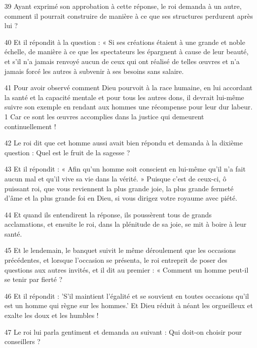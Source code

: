 \par 39 Ayant exprimé son approbation à cette réponse, le roi demanda à un autre, comment il pourrait construire de manière à ce que ses structures perdurent après lui ?

\par 40 Et il répondit à la question : « Si ses créations étaient à une grande et noble échelle, de manière à ce que les spectateurs les épargnent à cause de leur beauté, et s'il n'a jamais renvoyé aucun de ceux qui ont réalisé de telles œuvres et n'a jamais forcé les autres à subvenir à ses besoins sans salaire.

\par 41 Pour avoir observé comment Dieu pourvoit à la race humaine, en lui accordant la santé et la capacité mentale et pour tous les autres dons, il devrait lui-même suivre son exemple en rendant aux hommes une récompense pour leur dur labeur. 1 Car ce sont les œuvres accomplies dans la justice qui demeurent continuellement !

\par 42 Le roi dit que cet homme aussi avait bien répondu et demanda à la dixième question : Quel est le fruit de la sagesse ?

\par 43 Et il répondit : « Afin qu'un homme soit conscient en lui-même qu'il n'a fait aucun mal et qu'il vive sa vie dans la vérité. » Puisque c'est de ceux-ci, ô puissant roi, que vous reviennent la plus grande joie, la plus grande fermeté d'âme et la plus grande foi en Dieu, si vous dirigez votre royaume avec piété.

\par 44 Et quand ils entendirent la réponse, ils poussèrent tous de grands acclamations, et ensuite le roi, dans la plénitude de sa joie, se mit à boire à leur santé.

\par 45 Et le lendemain, le banquet suivit le même déroulement que les occasions précédentes, et lorsque l'occasion se présenta, le roi entreprit de poser des questions aux autres invités, et il dit au premier : « Comment un homme peut-il se tenir par fierté ?

\par 46 Et il répondit : 'S'il maintient l'égalité et se souvient en toutes occasions qu'il est un homme qui règne sur les hommes.' Et Dieu réduit à néant les orgueilleux et exalte les doux et les humbles !

\par 47 Le roi lui parla gentiment et demanda au suivant : Qui doit-on choisir pour conseillers ?


